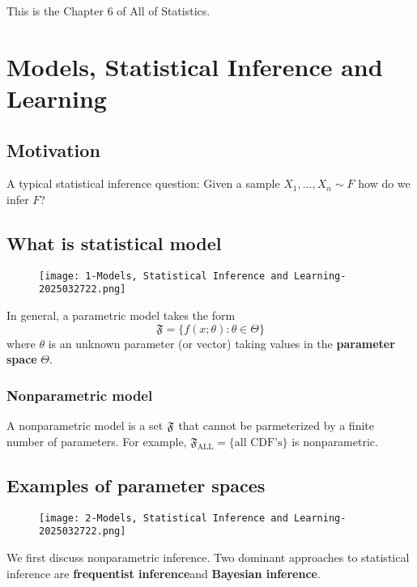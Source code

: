 This is the Chapter 6 of All of Statistics.

\section{Models, Statistical Inference and Learning}

\subsection{Motivation}

A typical statistical inference question: Given a sample $X_1,\dots,X_n\sim F$ how do we infer $F$?

\subsection{What is statistical model}

\begin{figure}[H]
\centering
\texttt{[image: 1-Models, Statistical Inference and Learning-2025032722.png]}
\label{}
\end{figure}

In general, a parametric model takes the form
\[
\mathfrak{F}=\{f(x ; \theta): \theta \in \Theta\}
\]
where $\theta$ is an unknown parameter (or vector) taking values in the \textbf{parameter space} $\Theta$.

\subsubsection{Nonparametric model}

A nonparametric model is a set $\frak{F}$ that cannot be parmeterized by a finite number of parameters. For example, $\mathfrak{F}_{\text{ALL}}=\{ \text{all CDF's} \}$ is nonparametric.

\subsection{Examples of parameter spaces}

\begin{figure}[H]
\centering
\texttt{[image: 2-Models, Statistical Inference and Learning-2025032722.png]}
\label{}
\end{figure}

\begin{remark}
We first discuss nonparametric inference. Two dominant approaches to statistical inference are \textbf{frequentist inference}and \textbf{Bayesian inference}.
\end{remark}
